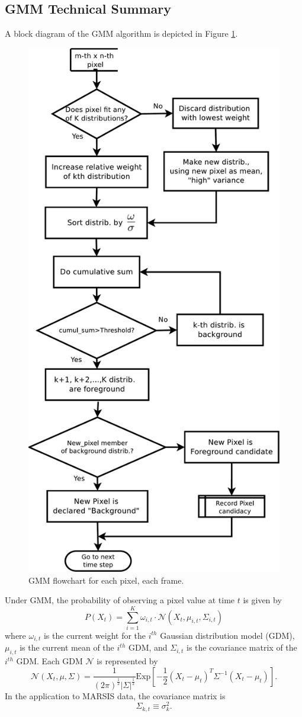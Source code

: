 \FloatBarrier
\subsection{GMM Technical Summary}\label{sec:TechSum}
A block diagram of the GMM algorithm is depicted in Figure \ref{fig:gmmbasic}. 
\begin{figure}\centering
	\includegraphics[width=0.6\linewidth]{gfx/GMMflowchart}
	\caption{GMM flowchart for each pixel, each frame.}\label{fig:gmmbasic}
\end{figure}
Under GMM, the probability of observing a pixel value at time $t$ is given by \begin{equation}\label{eq:totProb}
P\left(X_t\right)=\sum_{i=1}^K\omega_{i,t}\cdot\mathcal{N}\left(X_t,\mu_{i,t},\Sigma_{i,t}\right)
\end{equation}
where $\omega_{i,t}$ is the current weight for the $i^{th}$ Gaussian distribution model (GDM), $\mu_{i,t}$ is the current mean of the $i^{th}$ GDM, and $\Sigma_{i,t}$ is the covariance matrix of the $i^{th}$ GDM. 
Each GDM $\mathcal{N}$ is represented by
\begin{equation}\label{eq:GDM}
\mathcal{N}\left(X_t,\mu,\Sigma\right)=\frac{1}{(2\pi)^\frac{1}{2}\left|\Sigma\right|^\frac{1}{2}}\text{Exp}\left[-\frac{1}{2}\left(X_t-\mu_t\right)^T\Sigma^{-1}\left(X_t-\mu_t\right)\right].
\end{equation} 
In the application to MARSIS data, the covariance matrix is
\begin{equation}
\Sigma_{k,t}\equiv\sigma_k^2.
\end{equation} 

